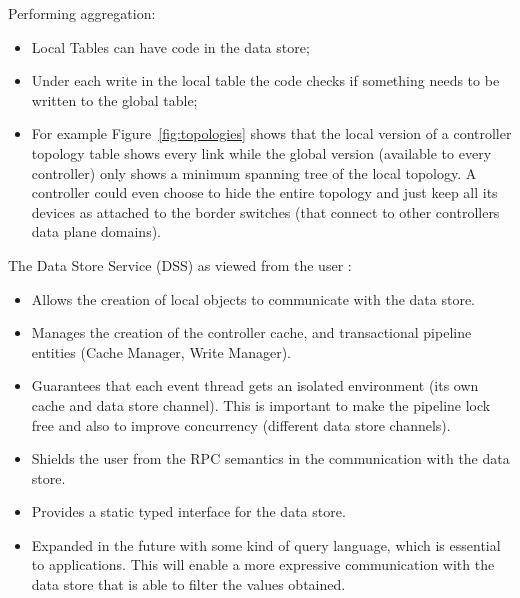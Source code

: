 Performing aggregation: 

\begin{itemize}
\item Local Tables can have code in the data store; 
\item Under each write in the local table the code checks if something needs to be written to the global table; 
\item For example Figure~\ref{fig:topologies} shows that the local version of a controller topology table shows every link while the global version (available to every controller) only shows a minimum spanning tree of the local topology.  A controller could even choose to hide the entire topology and just keep all its devices as attached to the border switches (that connect to other controllers data plane domains). 
\end{itemize}

The Data Store Service (DSS) as viewed from the user : 
\begin{itemize}
\item Allows the creation of local objects to communicate with the data store. 
\item Manages the creation of the controller cache, and transactional pipeline entities (Cache Manager, Write Manager). 
\item Guarantees that each event thread gets an isolated environment (its own cache and data store channel). This is important to make the pipeline lock free and also to improve concurrency (different data store channels). 
\item Shields the user from the RPC semantics in the communication with the data store. 
\item Provides a static typed interface for the data store. 
\item Expanded in the future with some kind of query language, which is essential to applications. This will enable a more expressive communication with the data store that is able to filter the values obtained. 
\end{itemize}
\
